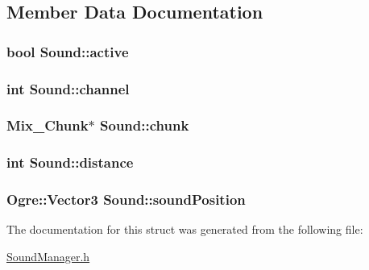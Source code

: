\subsection{Member Data Documentation}
\hypertarget{structSound_aada15bf9ccd1e956b92f5e772134705f}{
\subsubsection[{active}]{\setlength{\rightskip}{0pt plus 5cm}bool Sound\-::active}}\label{structSound_aada15bf9ccd1e956b92f5e772134705f}
\hypertarget{structSound_af3895edf5a39772f1de32cfbfff90909}{
\subsubsection[{channel}]{\setlength{\rightskip}{0pt plus 5cm}int Sound\-::channel}}\label{structSound_af3895edf5a39772f1de32cfbfff90909}
\hypertarget{structSound_a658d91b8d31c3420cf6106fcb6eaa223}{
\subsubsection[{chunk}]{\setlength{\rightskip}{0pt plus 5cm}Mix\-\_\-\-Chunk$\ast$ Sound\-::chunk}}\label{structSound_a658d91b8d31c3420cf6106fcb6eaa223}
\hypertarget{structSound_a259757aea073ec5c56a23955d56bf21b}{
\subsubsection[{distance}]{\setlength{\rightskip}{0pt plus 5cm}int Sound\-::distance}}\label{structSound_a259757aea073ec5c56a23955d56bf21b}
\hypertarget{structSound_a7032f013c11da2c354a6e41020e170a7}{
\subsubsection[{sound\-Position}]{\setlength{\rightskip}{0pt plus 5cm}Ogre\-::\-Vector3 Sound\-::sound\-Position}}\label{structSound_a7032f013c11da2c354a6e41020e170a7}


The documentation for this struct was generated from the following file\-:\begin{DoxyCompactItemize}
\item 
\hyperlink{SoundManager_8h}{Sound\-Manager.\-h}\end{DoxyCompactItemize}
